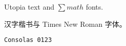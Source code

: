 \documentclass[UTF8]{ctexart}
\begin{document}
Utopia text and $\sum math$ fonts.

汉字楷书与 {\times Times New Roman} 字体。

\texttt{Consolas 0123}
\end{document}
